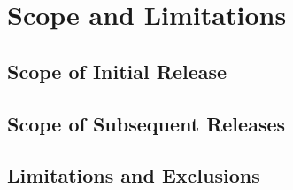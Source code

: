 \section{Scope and Limitations}
%
\subsection{Scope of Initial Release}
\subsection{Scope of Subsequent Releases}
\subsection{Limitations and Exclusions}
